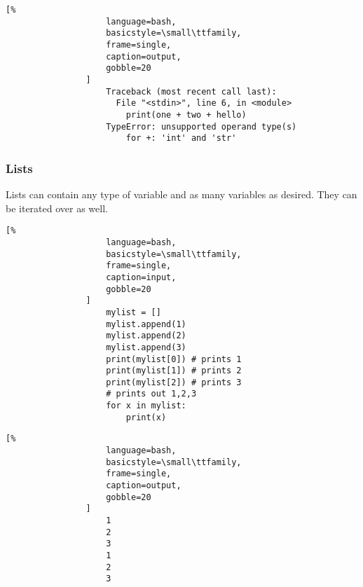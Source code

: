 \documentclass[crop=false,class=article,oneside]{standalone}
\begin{document}
            \begin{minipage}[t]{.48\textwidth}
                \centering
                \begin{lstlisting}[%
                    language=bash,
                    basicstyle=\small\ttfamily,
                    frame=single,
                    caption=output,
                    gobble=20
                ]
                    Traceback (most recent call last):
                      File "<stdin>", line 6, in <module>
                        print(one + two + hello)
                    TypeError: unsupported operand type(s)
                        for +: 'int' and 'str'
                \end{lstlisting}
            \end{minipage}
        \subsubsection{Lists}
            Lists can contain any type of variable and as many
            variables as desired. They can be iterated over as
            well.\newline
            \begin{minipage}[t]{.48\textwidth}
                \centering
                \begin{lstlisting}[%
                    language=bash,
                    basicstyle=\small\ttfamily,
                    frame=single,
                    caption=input,
                    gobble=20
                ]
                    mylist = []
                    mylist.append(1)
                    mylist.append(2)
                    mylist.append(3)
                    print(mylist[0]) # prints 1
                    print(mylist[1]) # prints 2
                    print(mylist[2]) # prints 3
                    # prints out 1,2,3
                    for x in mylist:
                        print(x)
                \end{lstlisting}
            \end{minipage}\hfill
            \begin{minipage}[t]{.48\textwidth}
                \centering
                \begin{lstlisting}[%
                    language=bash,
                    basicstyle=\small\ttfamily,
                    frame=single,
                    caption=output,
                    gobble=20
                ]
                    1
                    2
                    3
                    1
                    2
                    3
                \end{lstlisting}
            \end{minipage}
\end{document}
